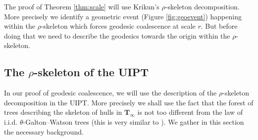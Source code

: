 \documentclass[AHL,XML,longabstracts,Unicode,NoSaveZebib]{cedram}
\begin{document}
	

The proof of Theorem \ref{thm:scale} will use Krikun's $\rho$-skeleton decomposition. More precisely we identify a geometric event (Figure \ref{fig:geoevent}) happening within the $\rho$-skeleton which forces geodesic coalescence at scale $r$. But before doing that we need to describe the geodesics towards the origin within the $\rho$-skeleton.


\subsection{The \texorpdfstring{$\rho$-}{rho-}skeleton of the UIPT}

In our proof of geodesic coalescence, we will use the description of the $\rho$-skeleton decomposition in the UIPT. More precisely we shall use the fact that the forest of trees describing the skeleton of hulls in $ \mathbf{T}_{\infty}$ is not too different from the law of i.i.d. $\theta$-Galton--{Watson} trees (this is very similar to \cite[Proposition 5]{CLGfpp}). We gather in this section the necessary background.\medskip
\end{document}
